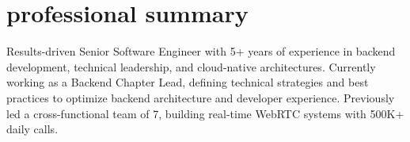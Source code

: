 \documentclass[a4paper]{article}
\begin{document}
\begin{minipage}[t]{0.65\textwidth}
  \preparetopsec
  \section{professional summary}
    \begin{justify}
      \begin{footnotesize}
Results-driven Senior Software Engineer with 5+ years of experience in backend 
development, technical leadership, and cloud-native architectures. Currently working
as a Backend Chapter Lead, defining technical strategies and best practices 
to optimize backend architecture and developer experience. Previously led a cross-functional 
team of 7, building real-time WebRTC systems with 500K+ daily calls.
      \end{footnotesize}
    \end{justify}
  \preparenormalsec

\end{minipage}
\end{document}
